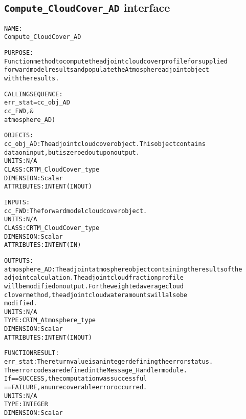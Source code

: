 \subsection{\texttt{Compute\_CloudCover\_AD} interface}
  \label{sec:Compute_CloudCover_AD_interface}
  \begin{alltt}
 
  NAME:
    Compute_CloudCover_AD
 
  PURPOSE:
    Function method to compute the adjoint cloud cover profile for supplied
    forward model results and populate the Atmosphere adjoint object
    with the results.
 
  CALLING SEQUENCE:
    err_stat = cc_obj_AD%Compute_CloudCover_AD( &
                 cc_FWD       , &
                 atmosphere_AD  )
 
  OBJECTS:
    cc_obj_AD:      The adjoint cloud cover object. This object contains
                    data on input, but is zeroed out upon output.
                    UNITS:      N/A
                    CLASS:      CRTM_CloudCover_type
                    DIMENSION:  Scalar
                    ATTRIBUTES: INTENT(IN OUT)
 
  INPUTS:
    cc_FWD:         The forward model cloud cover object.
                    UNITS:      N/A
                    CLASS:      CRTM_CloudCover_type
                    DIMENSION:  Scalar
                    ATTRIBUTES: INTENT(IN)
 
  OUTPUTS:
    atmosphere_AD:  The adjoint atmosphere object containing the results of the
                    adjoint calculation. The adjoint cloud fraction profile
                    will be modified on output. For the weighted average cloud
                    clover method, the adjoint cloud water amounts will also be
                    modified.
                    UNITS:      N/A
                    TYPE:       CRTM_Atmosphere_type
                    DIMENSION:  Scalar
                    ATTRIBUTES: INTENT(IN OUT)
 
  FUNCTION RESULT:
    err_stat:       The return value is an integer defining the error status.
                    The error codes are defined in the Message_Handler module.
                      If == SUCCESS, the computation was successful
                         == FAILURE, an unrecoverable error occurred.
                    UNITS:      N/A
                    TYPE:       INTEGER
                    DIMENSION:  Scalar
 
  \end{alltt}
